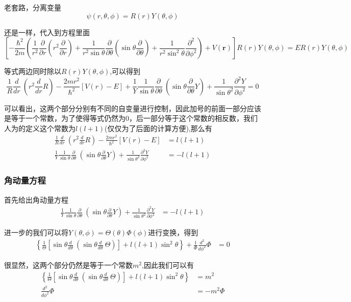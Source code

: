 \documentclass{article}
\newcommand{\Da}[2]{\frac{\partial}{\partial#2}#1}
\newcommand{\D}[2]{\frac{d}{d#2}#1}
\begin{document}
老套路，分离变量
\[
    \psi(r,\theta,\phi)=R(r)Y(\theta,\phi)
\]

还是一样，代入到方程里面
\[
    \left[-\frac{\hbar^2}{2m}\left(\frac{1}{r^2}\frac{\partial}{\partial r}\left(r^2\frac{\partial}{\partial r}\right)+\frac{1}{r^2\sin\theta}\frac{\partial}{\partial\theta}\left(\sin\theta\frac{\partial}{\partial\theta}\right)+\frac{1}{r^2\sin^2\theta}\frac{\partial^2}{\partial\phi^2}\right)+V(\textbf{r})\right]R(r)Y(\theta,\phi)=ER(r)Y(\theta,\phi)
\]

等式两边同时除以$R(r)Y(\theta,\phi)$,可以得到
\begin{equation*}
    \frac{1}{R}\D{~}{r}\left(r^2\D{R}{r}\right)-\frac{2mr^2}{\hbar^2}\left[V(r)-E\right]+\frac{1}{Y}\frac{1}{\sin{\theta}}\Da{~}{\theta}\left(\sin{\theta}\Da{Y}{\theta}\right)+\frac{1}{\sin{\theta}^2}\frac{\partial^2 Y}{\partial \phi^2}=0
\end{equation*}

可以看出，这两个部分分别有不同的自变量进行控制，因此加号的前面一部分应该是等于一个常数，为了使得等式仍然为$0$，后一部分等于这个常数的相反数，我们人为的定义这个常数为$l(l+1)$(仅仅为了后面的计算方便),那么有 
\begin{align*}
    \frac{1}{R}\D{~}{r}\left(r^2\D{R}{r}\right)-\frac{2mr^2}{\hbar^2}\left[V(r)-E\right]&=l(l+1)\\
    \frac{1}{Y}\frac{1}{\sin{\theta}}\Da{~}{\theta}\left(\sin{\theta}\Da{Y}{\theta}\right)+\frac{1}{\sin{\theta}^2}\frac{\partial^2 Y}{\partial \phi^2}&=-l(l+1)
\end{align*}
    



\subsubsection{角动量方程}
首先给出角动量方程
\begin{align*}
    \frac{1}{Y}\frac{1}{\sin{\theta}}\Da{~}{\theta}\left(\sin{\theta}\Da{Y}{\theta}\right)+\frac{1}{\sin{\theta}^2}\frac{\partial^2 Y}{\partial \phi^2}&=-l(l+1)
\end{align*}

进一步的我们可以将$Y(\theta,\phi)=\Theta(\theta)\Phi(\phi)$进行变换，得到
\begin{align*}
    \left\{\frac{1}{\Theta}\left[\sin{\theta}\D{~}{\theta}\left(\sin{\theta}\D{~}{\theta}\Theta\right)\right]+l(l+1)\sin^2{\theta}\right\}+\frac{1}{\Phi}\frac{d^2}{d\phi^2}\Phi&=0
\end{align*}


很显然，这两个部分仍然是等于一个常数$m^2$,因此我们可以有
\begin{align*}
    \left\{\frac{1}{\Theta}\left[\sin{\theta}\D{~}{\theta}\left(\sin{\theta}\D{~}{\theta}\Theta\right)\right]+l(l+1)\sin^2{\theta}\right\}&=m^2\\
    \frac{d^2}{d\phi^2}\Phi&=-m^2\Phi
\end{align*}
\end{document}
